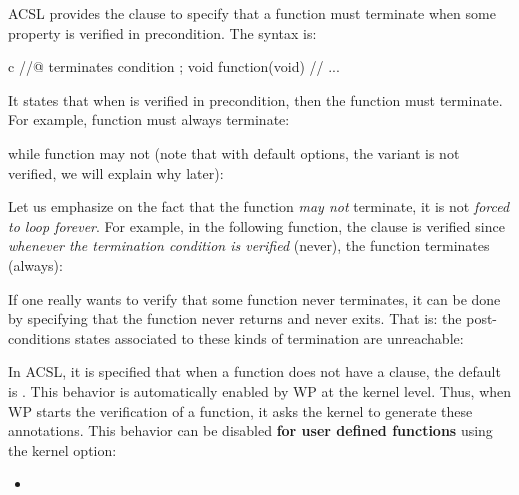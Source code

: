 ACSL provides the  clause to specify that a function must
terminate when some property is verified in precondition. The syntax is:


\begin{CodeBlock}{c}
//@ terminates condition ;
void function(void){
  // ...
}
\end{CodeBlock}


It states that when  is verified in precondition, then
the function must terminate. For example, function  must always
terminate:




while function  may not (note that with default options,
the variant is not verified, we will explain why later):




Let us emphasize on the fact that the function {\em may not} terminate, it is
not {\em forced to loop forever}. For example, in the following function, the
 clause is verified since
{\em whenever the termination condition is verified} (never), the function
terminates (always):




\begin{Information}
  If one really wants to verify that some function never terminates, it can be
  done by specifying that the function never returns and never exits. That is:
  the post-conditions states associated to these kinds of termination are
  unreachable:
\end{Information}


\begin{Information}
  In ACSL, it is specified that when a function does not have a
   clause, the default is
  . This behavior is automatically
  enabled by WP at the kernel level. Thus, when WP starts the verification of
  a function, it asks the kernel to generate these annotations. This behavior
  can be disabled \textbf{for user defined functions} using the kernel option:
  \begin{itemize}
    \item {}
  \end{itemize}
\end{Information}


